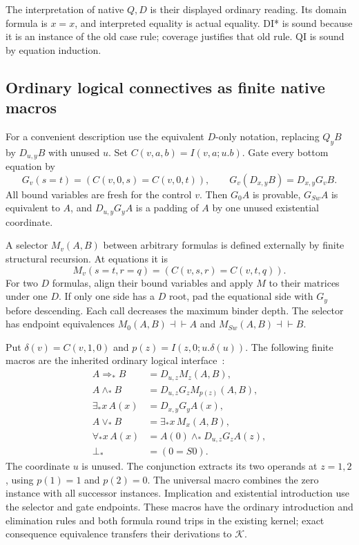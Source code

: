 \documentclass[11pt]{article}
\theoremstyle{definition}
\theoremstyle{remark}
\begin{document}
The interpretation of native $Q,D$ is their displayed ordinary reading.
Its domain formula is $x=x$, and interpreted equality is actual
equality. DI* is sound because it is an instance of the old case rule;
coverage justifies that old rule. QI is sound by equation induction.

\subsection{Ordinary logical connectives as finite native macros}

For a convenient description use the equivalent $D$-only notation,
replacing $Q_yB$ by $D_{u,y}B$ with unused $u$. Set
$C(v,a,b)=I(v,a;u.b)$. Gate every bottom equation by
\[
 G_v(s=t)=(C(v,0,s)=C(v,0,t)),\qquad
 G_v(D_{x,y}B)=D_{x,y}G_vB.
\]
All bound variables are fresh for the control $v$. Then $G_0A$ is
provable, $G_{Sw}A$ is equivalent to $A$, and
$D_{u,y}G_yA$ is a padding of $A$ by one unused existential coordinate.

A selector $M_v(A,B)$ between arbitrary formulas is defined externally
by finite structural recursion. At equations it is
\[
 M_v(s=t,r=q)=(C(v,s,r)=C(v,t,q)).
\]
For two $D$ formulas, align their bound variables and apply $M$ to their
matrices under one $D$. If only one side has a $D$ root, pad the
equational side with $G_y$ before descending. Each call decreases the
maximum binder depth. The selector has endpoint equivalences
$M_0(A,B)\dashv\vdash A$ and $M_{Sw}(A,B)\dashv\vdash B$.

Put $\delta(v)=C(v,1,0)$ and $p(z)=I(z,0;u.\delta(u))$. The following
finite macros are the inherited ordinary logical interface~\cite{choice}:
\begin{align*}
 A\Rightarrow_*B&=D_{u,z}M_z(A,B),\\
 A\wedge_*B&=D_{u,z}G_zM_{p(z)}(A,B),\\
 \exists_*x\,A(x)&=D_{x,y}G_yA(x),\\
 A\vee_*B&=\exists_*x\,M_x(A,B),\\
 \forall_*x\,A(x)&=A(0)\wedge_*D_{u,z}G_zA(z),\\
 \bot_*&=(0=S0).
\end{align*}
The coordinate $u$ is unused. The conjunction extracts its two operands
at $z=1,2$, using $p(1)=1$ and $p(2)=0$. The universal macro combines
the zero instance with all successor instances. Implication and
existential introduction use the selector and gate endpoints. These
macros have the ordinary introduction and elimination rules and both
formula round trips in the existing kernel; exact consequence
equivalence transfers their derivations to $\mathcal K$.
\end{document}
